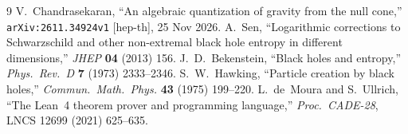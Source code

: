 \documentclass[10pt,twocolumn]{article}
\begin{document}
\begin{thebibliography}{9}
 V.~Chandrasekaran, ``An algebraic quantization of gravity from the null cone,'' \texttt{arXiv:2611.34924v1} [hep-th], 25 Nov 2026.
 A.~Sen, ``Logarithmic corrections to Schwarzschild and other non-extremal black hole entropy in different dimensions,'' \textit{JHEP} \textbf{04} (2013) 156.
 J.~D.~Bekenstein, ``Black holes and entropy,'' \textit{Phys.\ Rev.\ D} \textbf{7} (1973) 2333--2346.
 S.~W.~Hawking, ``Particle creation by black holes,'' \textit{Commun.\ Math.\ Phys.} \textbf{43} (1975) 199--220.
 L.~de~Moura and S.~Ullrich, ``The Lean~4 theorem prover and programming language,'' \textit{Proc.\ CADE-28}, LNCS 12699 (2021) 625--635.
\end{thebibliography}
\end{document}
